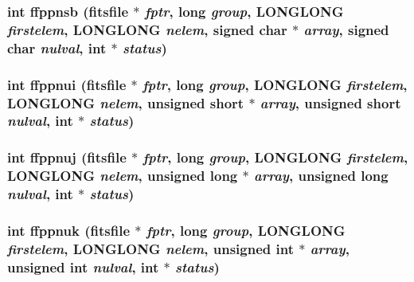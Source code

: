 \subsubsection{\setlength{\rightskip}{0pt plus 5cm}int ffppnsb (\bf{fitsfile} $\ast$ {\em fptr}, long {\em group}, \bf{LONGLONG} {\em firstelem}, \bf{LONGLONG} {\em nelem}, signed char $\ast$ {\em array}, signed char {\em nulval}, int $\ast$ {\em status})}\label{fitsio__64_8h_d663bf4dbce34e909c2eb15c2da1a376}


\subsubsection{\setlength{\rightskip}{0pt plus 5cm}int ffppnui (\bf{fitsfile} $\ast$ {\em fptr}, long {\em group}, \bf{LONGLONG} {\em firstelem}, \bf{LONGLONG} {\em nelem}, unsigned short $\ast$ {\em array}, unsigned short {\em nulval}, int $\ast$ {\em status})}\label{fitsio__64_8h_525842763bdaa4507a3a935d347a0462}


\subsubsection{\setlength{\rightskip}{0pt plus 5cm}int ffppnuj (\bf{fitsfile} $\ast$ {\em fptr}, long {\em group}, \bf{LONGLONG} {\em firstelem}, \bf{LONGLONG} {\em nelem}, unsigned long $\ast$ {\em array}, unsigned long {\em nulval}, int $\ast$ {\em status})}\label{fitsio__64_8h_fc1d4fc6ae72ad09956653077c3813af}


\subsubsection{\setlength{\rightskip}{0pt plus 5cm}int ffppnuk (\bf{fitsfile} $\ast$ {\em fptr}, long {\em group}, \bf{LONGLONG} {\em firstelem}, \bf{LONGLONG} {\em nelem}, unsigned int $\ast$ {\em array}, unsigned int {\em nulval}, int $\ast$ {\em status})}\label{fitsio__64_8h_95d87d24a1245de2f3cb4178a78cac04}


